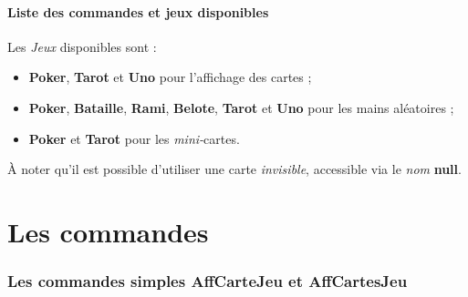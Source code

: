 \documentclass[a4paper]{article}
\newcommand\Cle[1]{{\bfseries\sffamily\textlangle #1\textrangle}}
\begin{document}
\subsection{Liste des commandes et jeux disponibles}

\begin{codeinfo}
Les \textit{Jeux} disponibles sont :

\begin{itemize}
  \item \Cle{Poker}, \Cle{Tarot} et \Cle{Uno} pour l'affichage des cartes ;
  \item \Cle{Poker}, \Cle{Bataille}, \Cle{Rami}, \Cle{Belote}, \Cle{Tarot}  et \Cle{Uno} pour les mains aléatoires ;
  \item \Cle{Poker} et \Cle{Tarot} pour les \textit{mini-}cartes.
\end{itemize}

À noter qu'il est possible d'utiliser une carte \textit{invisible}, accessible via le \textit{nom} \Cle{null}.
\end{codeinfo}

\begin{codetex}






\end{codetex}

\pagebreak

\part{Les commandes}

\section{Les commandes simples \og AffCarteJeu \fg{} et \og AffCartesJeu \fg}
\end{document}
